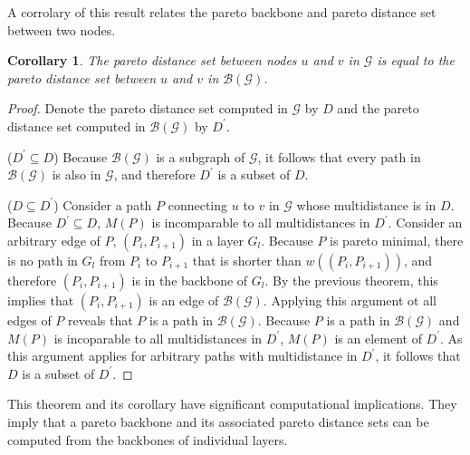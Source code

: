 \documentclass{article}
\newtheorem{corollary}{Corollary}[theorem]
\begin{document}
A corrolary of this result relates the pareto backbone and pareto distance set between two nodes.

\begin{corollary}
    The pareto distance set between nodes $u$ and $v$ in $\mathcal{G}$ is equal to the pareto distance
    set between $u$ and $v$ in $\mathcal{B}(\mathcal{G})$.
\end{corollary}
\begin{proof}
    Denote the pareto distance set computed in $\mathcal{G}$ by $D$ and the pareto distance set computed
    in $\mathcal{B}(\mathcal{G})$ by $D^\prime$. 
    
    ($D^\prime\subseteq D$) Because $\mathcal{B}(\mathcal{G})$ is a subgraph of
    $\mathcal{G}$, it follows that every path in $\mathcal{B}(\mathcal{G})$ is also in $\mathcal{G}$, and
    therefore $D^\prime$ is a subset of $D$.

    ($D\subseteq D^\prime$) Consider a path $P$ connecting $u$ to $v$ in $\mathcal{G}$ whose
    multidistance is in $D$. Because $D^\prime\subseteq D$, $M(P)$ is incomparable to
    all multidistances in $D^\prime$. Consider an arbitrary edge of $P$, $(P_i,P_{i+1})$
    in a layer $G_l$. Because $P$ is pareto minimal, there is no path in $G_l$ from $P_i$ to
    $P_{i+1}$ that is shorter than $w((P_i,P_{i+1}))$, and therefore $(P_i,P_{i+1})$ is in the backbone
    of $G_l$. By the previous theorem, this implies that $(P_i,P_{i+1})$ is an edge of 
    $\mathcal{B}(\mathcal{G})$. Applying this argument ot all edges of $P$ reveals that $P$ is a path in
    $\mathcal{B}(\mathcal{G})$. Because $P$ is a path in $\mathcal{B}(\mathcal{G})$ and $M(P)$ is 
    incoparable to
    all multidistances in $D^\prime$, $M(P)$ is an element of $D^\prime$. As this argument applies for 
    arbitrary paths with multidistance in $D^\prime$, it follows that $D$ is a subset of
    $D^\prime$.
\end{proof}

This theorem and its corollary have significant computational implications. They imply that a pareto
backbone and its associated pareto distance sets can be computed from the backbones of individual layers.
\end{document}
